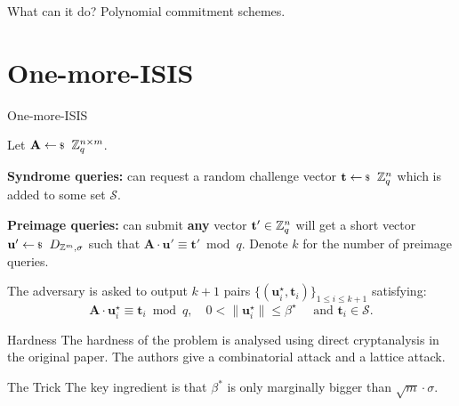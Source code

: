 \documentclass[xcolor=table,10pt,aspectratio=169]{beamer}
\renewcommand{\vec}[1]{\ensuremath{\mathbf{#1}}\xspace}
\providecommand{\mat}[1]{\ensuremath{\vec{#1}}\xspace}
\begin{document}
\begin{frame}[label={sec:org3105f2e}]{What can it do?}
Polynomial commitment schemes.
\end{frame}

\section{One-more-ISIS}
\label{sec:org4e3994e}

\begin{frame}[label={sec:org8ca8239}]{One-more-ISIS}
\begin{definition}
Let \(\mat{A} \sample \ZZ_{q}^{n \times m}\).

\textbf{Syndrome queries:} can request a random challenge vector \(\vec{t} \sample \ZZ_{q}^{n}\) which is added to some set \(\mathcal{S}\).

\textbf{Preimage queries:} can submit \textbf{any} vector \(\vec{t}' \in \ZZ_{q}^{n}\) will get a short vector \(\vec{u}' \sample D_{\ZZ^m,\sigma}\) such that \(\mat{A} \cdot \vec{u}' \equiv \vec{t}' \bmod q\). Denote \(k\) for the number of preimage queries.

The adversary is asked to output \(k+1\) pairs \(\{(\vec{u}^{\star}_i,\vec{t}_i)\}_{1 \le i \leq k+1}\) satisfying:
\[\mat{A}\cdot \vec{u}_{i}^{\star} \equiv \vec{t}_{i} \bmod q,\quad 0 < \|\vec{u}^\star_{i}\| \leq \beta^{\star} \quad \text{ and }\vec{t}_{i} \in \mathcal{S}.\]
\end{definition}

{\footnotesize {} \par}
\end{frame}

\begin{frame}[label={sec:org6f1f95f}]{Hardness}
The hardness of the problem is analysed using direct cryptanalysis in the original paper. The authors give a combinatorial attack and a lattice attack.

\begin{block}{The Trick}
The key ingredient is that \(\beta^{*}\) is only marginally bigger than \(\sqrt{m} \cdot \sigma\).
\end{block}
\end{frame}
\end{document}
